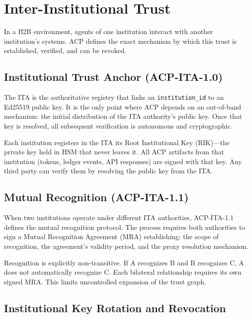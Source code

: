 \documentclass[11pt]{article}
\theoremstyle{definition}
\begin{document}
\section{Inter-Institutional Trust}

In a B2B environment, agents of one institution interact with another institution's systems.
ACP defines the exact mechanism by which this trust is established, verified, and can be revoked.

\subsection{Institutional Trust Anchor (ACP-ITA-1.0)}

The ITA is the authoritative registry that links an \texttt{institution\_id} to an Ed25519 public key.
It is the only point where ACP depends on an out-of-band mechanism: the initial distribution of the ITA authority's public key.
Once that key is resolved, all subsequent verification is autonomous and cryptographic.

Each institution registers in the ITA its Root Institutional Key (RIK)---the private key held in HSM that never leaves it.
All ACP artifacts from that institution (tokens, ledger events, API responses) are signed with that key.
Any third party can verify them by resolving the public key from the ITA.

\subsection{Mutual Recognition (ACP-ITA-1.1)}

When two institutions operate under different ITA authorities,
ACP-ITA-1.1 defines the mutual recognition protocol.
The process requires both authorities to sign a Mutual Recognition Agreement (MRA) establishing:
the scope of recognition, the agreement's validity period,
and the proxy resolution mechanism.

Recognition is explicitly non-transitive.
If A recognizes B and B recognizes C, A does not automatically recognize C.
Each bilateral relationship requires its own signed MRA.
This limits uncontrolled expansion of the trust graph.

\subsection{Institutional Key Rotation and Revocation}
\end{document}
